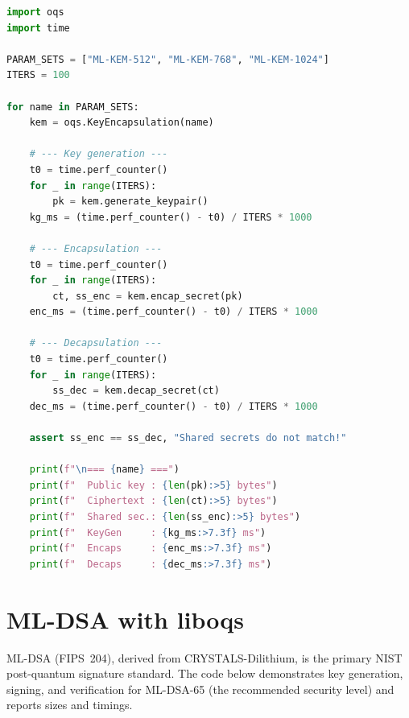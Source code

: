 \begin{lstlisting}[language=Python,caption={ML-KEM key encapsulation with liboqs}]
import oqs
import time

PARAM_SETS = ["ML-KEM-512", "ML-KEM-768", "ML-KEM-1024"]
ITERS = 100

for name in PARAM_SETS:
    kem = oqs.KeyEncapsulation(name)

    # --- Key generation ---
    t0 = time.perf_counter()
    for _ in range(ITERS):
        pk = kem.generate_keypair()
    kg_ms = (time.perf_counter() - t0) / ITERS * 1000

    # --- Encapsulation ---
    t0 = time.perf_counter()
    for _ in range(ITERS):
        ct, ss_enc = kem.encap_secret(pk)
    enc_ms = (time.perf_counter() - t0) / ITERS * 1000

    # --- Decapsulation ---
    t0 = time.perf_counter()
    for _ in range(ITERS):
        ss_dec = kem.decap_secret(ct)
    dec_ms = (time.perf_counter() - t0) / ITERS * 1000

    assert ss_enc == ss_dec, "Shared secrets do not match!"

    print(f"\n=== {name} ===")
    print(f"  Public key : {len(pk):>5} bytes")
    print(f"  Ciphertext : {len(ct):>5} bytes")
    print(f"  Shared sec.: {len(ss_enc):>5} bytes")
    print(f"  KeyGen     : {kg_ms:>7.3f} ms")
    print(f"  Encaps     : {enc_ms:>7.3f} ms")
    print(f"  Decaps     : {dec_ms:>7.3f} ms")
\end{lstlisting}

\section{ML-DSA with liboqs}
\label{app:mldsa-impl}

ML-DSA (FIPS~204), derived from CRYSTALS-Dilithium, is the primary NIST
post-quantum signature standard. The code below demonstrates key generation,
signing, and verification for ML-DSA-65 (the recommended security level)
and reports sizes and timings.

